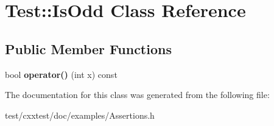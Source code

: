 \hypertarget{classTest_1_1IsOdd}{\section{Test\-:\-:Is\-Odd Class Reference}
\label{classTest_1_1IsOdd}
}
\subsection*{Public Member Functions}
\begin{DoxyCompactItemize}
\item 
\hypertarget{classTest_1_1IsOdd_a067778c43cd3c9e06f644c261419ffc5}{bool {\bfseries operator()} (int x) const }\label{classTest_1_1IsOdd_a067778c43cd3c9e06f644c261419ffc5}

\end{DoxyCompactItemize}


The documentation for this class was generated from the following file\-:\begin{DoxyCompactItemize}
\item 
test/cxxtest/doc/examples/Assertions.\-h\end{DoxyCompactItemize}
